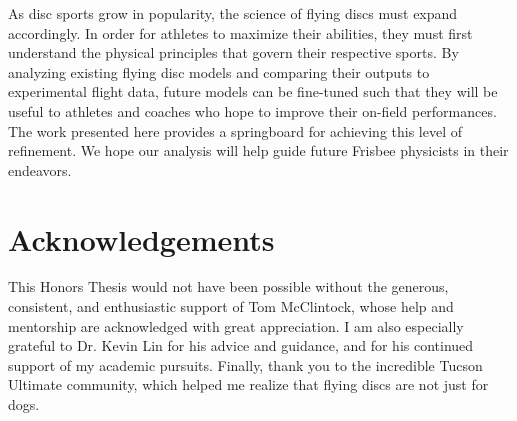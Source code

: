 \documentclass[a4paper,12pt, oneside]{article}
\begin{document}
As disc sports grow in popularity, the science of flying discs must expand accordingly. In order for athletes to maximize their abilities, they must first understand the physical principles that govern their respective sports. By analyzing existing flying disc models and comparing their outputs to experimental flight data, future models can be fine-tuned such that they will be useful to athletes and coaches who hope to improve their on-field performances. The work presented here provides a springboard for achieving this level of refinement. We hope our analysis will help guide future Frisbee physicists in their endeavors.
\section{Acknowledgements}
This Honors Thesis would not have been possible without the generous, consistent, and enthusiastic support of Tom McClintock, whose help and mentorship are acknowledged with great appreciation. I am also especially grateful to Dr. Kevin Lin for his advice and guidance, and for his continued support of my academic pursuits. Finally, thank you to the incredible Tucson Ultimate community, which helped me realize that flying discs are not just for dogs.



\end{document}
